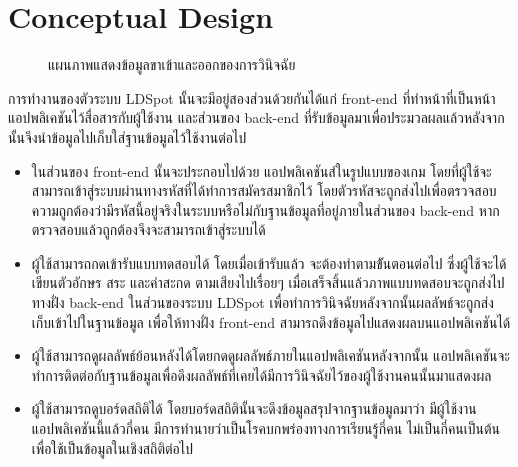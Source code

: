 \documentclass[12pt,oneside,openright,a4paper]{cpe-thai-project}
\begin{document}
\section{Conceptual  Design}
\begin{figure}[!ht]\centering
  \setlength{\fboxrule}{0.2mm} %
  \setlength{\fboxsep}{1cm}
  \caption{แผนภาพแสดงข้อมูลขาเข้าและออกของการวินิจฉัย}\label{fig:system}
 \end{figure}
 การทำงานของตัวระบบ LDSpot นั้นจะมีอยู่สองส่วนด้วยกันได้แก่ front-end ที่ทำหน้าที่เป็นหน้าแอปพลิเคชันไว้สื่อสารกับผู้ใช้งาน และส่วนของ back-end ที่รับข้อมูลมาเพื่อประมวลผลแล้วหลังจากนั้นจึงนำข้อมูลไปเก็บใส่ฐานข้อมูลไว้ใช้งานต่อไป 
 \begin{itemize}
   \item ในส่วนของ front-end นั้นจะประกอบไปด้วย แอปพลิเคชันส์ในรูปแบบของเกม โดยที่ผู้ใช้จะสามารถเข้าสู่ระบบผ่านทางรหัสที่ได้ทำการสมัครสมาชิกไว้
    โดยตัวรหัสจะถูกส่งไปเพื่อตรวจสอบความถูกต้องว่ามีรหัสนี้อยู่จริงในระบบหรือไม่กับฐานข้อมูลที่อยู่ภายในส่วนของ back-end หากตรวจสอบแล้วถูกต้องจึงจะสามารถเข้าสู่ระบบได้ 
   \item ผู้ใช้สามารถกดเข้ารับแบบทดสอบได้ โดยเมื่อเข้ารับแล้ว จะต้องทำตามข้ันตอนต่อไป ซึ่งผู้ใช้จะได้เขียนตัวอักษร สระ และคำสะกด ตามเสียงไปเรื่อยๆ เมื่อเสร็จสิ้นแล้วภาพแบบทดสอบจะถูกส่งไปทางฝั่ง back-end 
   ในส่วนของระบบ LDSpot เพื่อทำการวินิจฉัยหลังจากนั้นผลลัพธ์จะถูกส่งเก็บเข้าไปในฐานข้อมูล เพื่อให้ทางฝั่ง front-end สามารถดึงข้อมูลไปแสดงผลบนแอปพลิเคชันได้
   \item ผู้ใช้สามารถดูผลลัพธ์ย้อนหลังได้โดยกดดูผลลัพธ์ภายในแอปพลิเคชันหลังจากนั้น แอปพลิเคชันจะทำการติดต่อกับฐานข้อมูลเพื่อดึงผลลัพธ์ที่เคยได้มีการวินิจฉัยไว้ของผู้ใช้งานคนนั้นมาแสดงผล
   \item ผู้ใช้สามารถดูบอร์ดสถิติได้ โดยบอร์ดสถิตินั้นจะดึงข้อมูลสรุปจากฐานข้อมูลมาว่า มีผู้ใช้งานแอปพลิเคชันนี้แล้วกี่คน มีการทำนายว่าเป็นโรคบกพร่องทางการเรียนรู้กี่คน ไม่เป็นกี่คนเป็นต้น เพื่อใช้เป็นข้อมูลในเชิงสถิติต่อไป
 \end{itemize}
\end{document}
